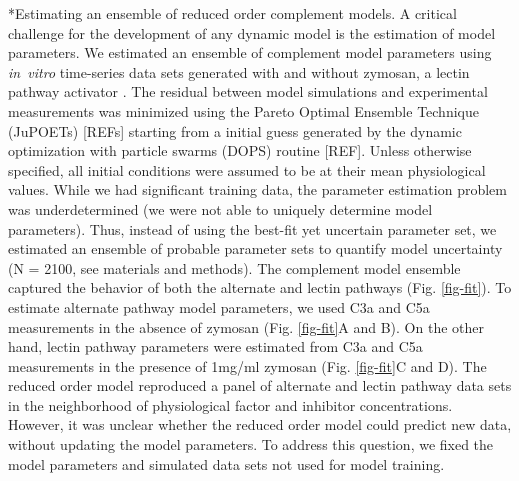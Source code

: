 \documentclass[12pt]{article}
\makeatletter
\renewcommand\subsection{\@startsection
	{subsection}{2}{0mm}
	{-0.05in}
	{-0.5\baselineskip}
	{\normalfont\normalsize\bfseries}}
\makeatother
\begin{document}
\subsection*{Estimating an ensemble of reduced order complement models.}
A critical challenge for the development of any dynamic model is the estimation of model parameters.
We estimated an ensemble of complement model parameters using \textit{in~vitro} time-series data sets generated with and without zymosan, a lectin pathway activator \cite{morad2015time}.
The residual between model simulations and experimental measurements was minimized using the Pareto Optimal Ensemble Technique (JuPOETs) [REFs] starting
from a initial guess generated by the dynamic optimization with particle swarms (DOPS) routine [REF].
Unless otherwise specified, all initial conditions were assumed to be at their mean physiological values.
While we had significant training data, the parameter estimation problem was underdetermined (we were not able to uniquely determine model parameters).
Thus, instead of using the best-fit yet uncertain parameter set, we estimated an ensemble of probable parameter sets to quantify model uncertainty
(N = 2100, see materials and methods).
The complement model ensemble captured the behavior of both the alternate and lectin pathways (Fig. \ref{fig-fit}).
To estimate alternate pathway model parameters, we used C3a and C5a measurements in the absence of zymosan (Fig. \ref{fig-fit}A and B).
On the other hand, lectin pathway parameters were estimated from C3a and C5a measurements in the presence of 1mg/ml zymosan (Fig. \ref{fig-fit}C and D).
The reduced order model reproduced a panel of alternate and lectin pathway data sets in the neighborhood of physiological factor and inhibitor concentrations.
However, it was unclear whether the reduced order model could predict new data, without updating the model parameters.
To address this question, we fixed the model parameters and simulated data sets not used for model training.

\end{document}
